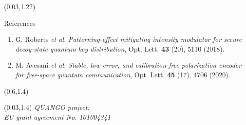 \documentclass[final]{beamer}
\begin{document}
\begin{frame}
	\begin{textblock}{0.965}(0.03,1.22)
		\begin{block}{\large References}
			\vskip-0.2cm
			{\footnotesize
			\begin{enumerate}
				\item G. Roberts \textit{et al.} \emph{Patterning-effect mitigating intensity modulator for secure decoy-state quantum key distribution}, Opt. Lett. \textbf{43} (20), 5110 (2018).\label{robertz}
				\item M. Avesani \textit{et al.} \emph{Stable, low-error, and calibration-free polarization encoder for free-space quantum communication}, Opt. Lett. \textbf{45} (17), 4706 (2020).\label{ipognac}
			\end{enumerate}
			}
		\end{block}
	\end{textblock}

	\begin{textblock}{0.42}(0.6,1.4)
	\end{textblock}
	\begin{textblock}{0.2}(0.03,1.4)
		{\color{white} \itshape \footnotesize QUANGO project:\\ EU grant agreement No. 101004341}
	\end{textblock}
\end{frame}
\end{document}
